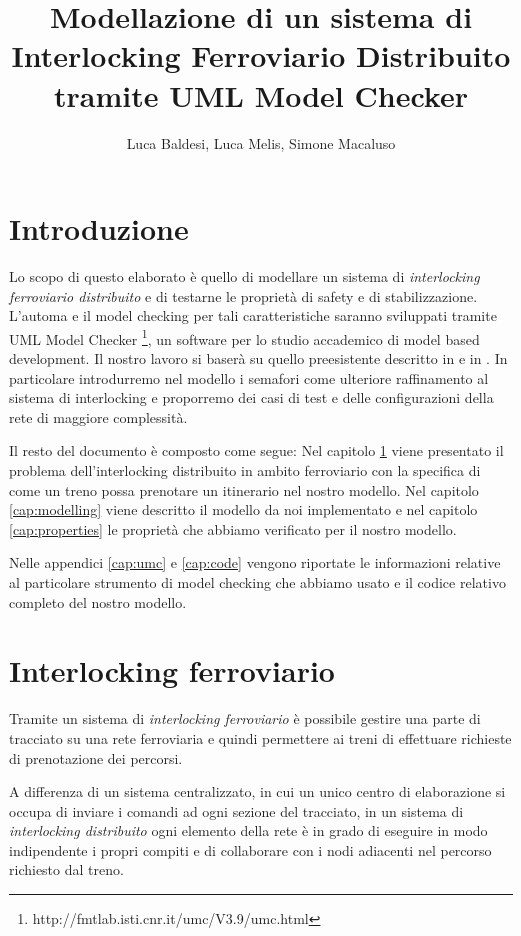 \documentclass[10pt,a4paper,oneside]{report}
\author{Luca Baldesi, Luca Melis, Simone Macaluso}
\title{Modellazione di un sistema di
Interlocking Ferroviario Distribuito
tramite UML Model Checker
}
\begin{document}
\maketitle
\tableofcontents
\chapter*{Introduzione}
Lo scopo di questo elaborato è quello di modellare un sistema di \emph{interlocking ferroviario distribuito} e di testarne le proprietà di safety e di stabilizzazione. L'automa e il model checking per tali caratteristiche saranno sviluppati tramite UML Model Checker \footnote{http://fmtlab.isti.cnr.it/umc/V3.9/umc.html}, un software per lo studio accademico di model based development. Il nostro lavoro si baserà su quello preesistente descritto in \cite{Paolieri} e in \cite{RossettoRocciolo}. In particolare introdurremo nel modello i semafori come ulteriore raffinamento al sistema di interlocking e proporremo dei casi di test e delle configurazioni della rete di maggiore complessità.

Il resto del documento è composto come segue:
Nel capitolo \ref{cap:interlocking} viene presentato il problema dell'interlocking distribuito in ambito ferroviario con la specifica di come un treno possa prenotare un itinerario nel nostro modello. Nel capitolo \ref{cap:modelling} viene descritto il modello da noi implementato e nel capitolo \ref{cap:properties} le proprietà che abbiamo verificato per il nostro modello.

Nelle appendici \ref{cap:umc} e \ref{cap:code} vengono riportate le informazioni relative al particolare strumento di model checking che abbiamo usato e il codice relativo completo del nostro modello.
\chapter{Interlocking ferroviario}
\label{cap:interlocking}
Tramite un sistema di \textit{interlocking ferroviario} è possibile gestire una parte di tracciato su una rete ferroviaria e quindi permettere ai treni di effettuare richieste di prenotazione dei percorsi.

A differenza di un sistema centralizzato, in cui un unico centro di elaborazione si occupa di inviare i comandi ad ogni sezione del tracciato, in un sistema di \textit{interlocking distribuito} ogni elemento della rete è in grado di eseguire in modo indipendente i propri compiti e di collaborare con i nodi adiacenti nel percorso richiesto dal treno.
\end{document}
